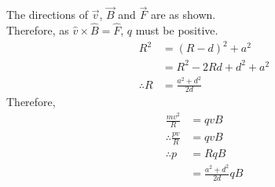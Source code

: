 \documentclass[fleqn, a4paper, 11pt, oneside]{amsart}
\theoremstyle{definition}
\theoremstyle{theorem}
\begin{document}
\begin{solution}
	\begin{figure}[H]
	\end{figure}
	The directions of $\overrightarrow{v}$, $\overrightarrow{B}$ and $\overrightarrow{F}$ are as shown.\\
	Therefore, as $\hat{v} \times \hat{B} = \hat{F}$, $q$ must be positive.
	\begin{align*}
		R^2 &= (R - d)^2 + a^2\\
			&= R^2 - 2 R d + d^2 + a^2\\
		\therefore R &= \frac{a^2 + d^2}{2 d}
	\end{align*}
	Therefore,
	\begin{align*}
		\frac{m v^2}{R} &= q v B\\
		\therefore \frac{p v}{R} &= q v B\\
		\therefore p &= R q B\\
		&= \frac{a^2 + d^2}{2 d} q B
	\end{align*}
\end{solution}
\end{document}
